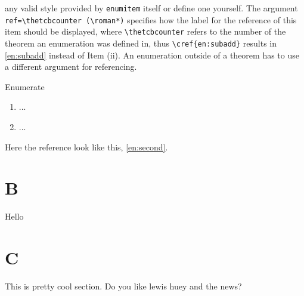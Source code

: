 any valid style provided by \texttt{enumitem} itself or define one yourself. 
The argument 
\lstinline[language={[LaTeX]TeX}]|ref=\thetcbcounter (\roman*)|
specifies how the label for 
the reference of this item should be displayed, where \lstinline[language={[LaTeX]TeX}]|\thetcbcounter| 
refers to the number of the theorem an enumeration was defined in, thus 
\lstinline[language={[LaTeX]TeX}]|\cref{en:subadd}| results in \cref{en:subadd} 
instead of \textcolor{\colmain}{Item (ii)}. An enumeration outside of a theorem has to use a different
argument for referencing.
\begin{lstbox}[]{Enumerate}
\begin{enumerate}[label=(K\theenumi), ref=MyEnum (K\theenumi)]
\item ... %
\item\label{en:second} ... %
\end{enumerate} 
\end{lstbox}
Here the reference look like this, \cref{en:second}.

\section{B}
Hello
\section{C}
This is pretty cool section.\newpage
Do you like lewis huey and the news?